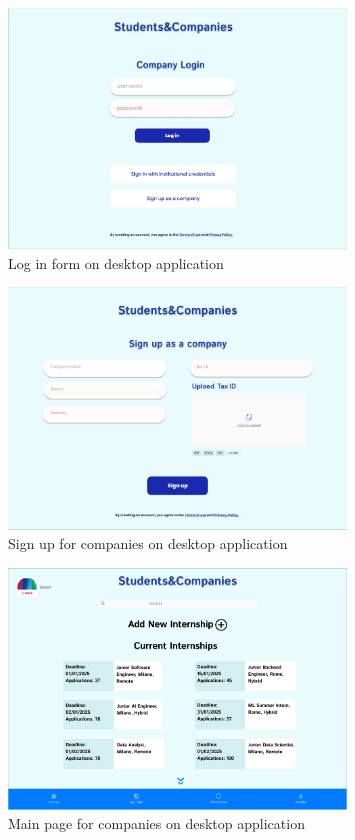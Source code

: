 \clearpage

\begin{figure}[ht]
    \centering
    \includegraphics[width=0.8\textwidth]{RASD-Latex/assets/UI images/login_desktop.png}
    \caption{Log in form on desktop application}
    \label{fig:image4}
\end{figure}


\begin{figure}[ht]
    \centering
    \includegraphics[width=0.8\textwidth]{RASD-Latex/assets/UI images/signup_company_desktop.png}
    \caption{Sign up for companies on desktop application}
    \label{fig:image5}
\end{figure}


\begin{figure}[ht]
    \centering
    \includegraphics[width=0.8\textwidth]{RASD-Latex/assets/UI images/mainpage_company_desktop.png}
    \caption{Main page for companies on desktop application}
    \label{fig:image6}
\end{figure}


